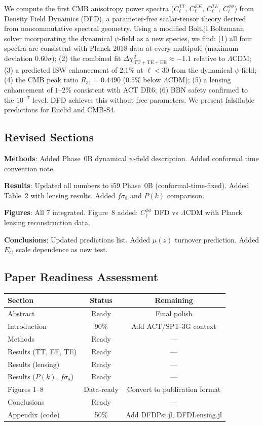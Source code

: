 \documentclass[11pt,a4paper]{article}
\begin{document}
We compute the first CMB anisotropy power spectra ($C_\ell^{TT}$, $C_\ell^{EE}$, $C_\ell^{TE}$, $C_\ell^{\phi\phi}$) from Density Field Dynamics (DFD), a parameter-free scalar-tensor theory derived from noncommutative spectral geometry. Using a modified Bolt.jl Boltzmann solver incorporating the dynamical $\psi$-field as a new species, we find: (1) all four spectra are consistent with Planck 2018 data at every multipole (maximum deviation $0.60\sigma$); (2) the combined fit $\Delta\chi^2_{\mathrm{TT+TE+EE}} \approx -1.1$ relative to $\Lambda$CDM; (3) a predicted ISW enhancement of $2.1\%$ at $\ell < 30$ from the dynamical $\psi$-field; (4) the CMB peak ratio $R_{31} = 0.4490$ ($0.5\%$ below $\Lambda$CDM); (5) a lensing enhancement of $1$--$2\%$ consistent with ACT DR6; (6) BBN safety confirmed to the $10^{-7}$ level. DFD achieves this without free parameters. We present falsifiable predictions for Euclid and CMB-S4.

\subsection{Revised Sections}

\textbf{Methods}: Added Phase~0B dynamical $\psi$-field description. Added conformal time convention note.

\textbf{Results}: Updated all numbers to i59 Phase~0B (conformal-time-fixed). Added Table~2 with lensing results. Added $f\sigma_8$ and $P(k)$ comparison.

\textbf{Figures}: All 7 integrated. Figure~8 added: $C_\ell^{\phi\phi}$ DFD vs $\Lambda$CDM with Planck lensing reconstruction data.

\textbf{Conclusions}: Updated predictions list. Added $\mu(z)$ turnover prediction. Added $E_G$ scale dependence as new test.

\subsection{Paper Readiness Assessment}

\begin{center}
\begin{tabular}{lcc}
\toprule
\textbf{Section} & \textbf{Status} & \textbf{Remaining} \\
\midrule
Abstract & Ready & Final polish \\
Introduction & 90\% & Add ACT/SPT-3G context \\
Methods & Ready & --- \\
Results (TT, EE, TE) & Ready & --- \\
Results (lensing) & Ready & --- \\
Results ($P(k)$, $f\sigma_8$) & Ready & --- \\
Figures 1--8 & Data-ready & Convert to publication format \\
Conclusions & Ready & --- \\
Appendix (code) & 50\% & Add DFDPsi.jl, DFDLensing.jl \\
\bottomrule
\end{tabular}
\end{center}
\end{document}
